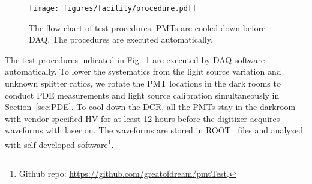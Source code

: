 \begin{figure}
    \centering
    \texttt{[image: figures/facility/procedure.pdf]}
    \caption{The flow chart of test procedures. PMTs are cooled down before DAQ. The procedures are executed automatically.}
    \label{fig:testingprocedure}
\end{figure}

The test procedures indicated in Fig.~\ref{fig:testingprocedure} are executed by DAQ software automatically. To lower the systematics from the light source variation and unknown splitter ratios, we rotate the PMT locations in the dark rooms to conduct PDE measurements and light source calibration simultaneously in Section~\ref{sec:PDE}. To cool down the DCR, all the PMTs stay in the darkroom with vendor-specified HV for at least 12 hours before the digitizer acquires waveforms with laser on. The waveforms are stored in ROOT~\cite{brun_root_1997} files and analyzed with self-developed software\footnote{Github repo: \url{https://github.com/greatofdream/pmtTest}.}.
